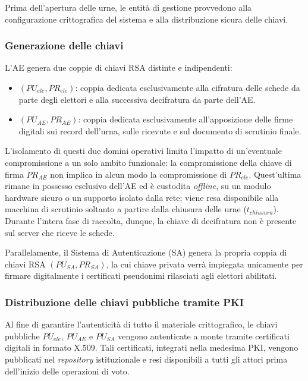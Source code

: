 Prima dell'apertura delle urne, le entità di gestione provvedono alla configurazione crittografica del sistema e alla distribuzione sicura delle chiavi.

\subsubsection{Generazione delle chiavi}
\label{subsubsec:wp2_generazione_chiavi}

L'AE genera due coppie di chiavi RSA distinte e indipendenti:
\begin{itemize}
    \item $(PU_{ele}, PR_{ele})$: coppia dedicata esclusivamente alla cifratura delle schede da parte degli elettori e alla successiva decifratura da parte dell'AE.
    \item $(PU_{AE}, PR_{AE})$: coppia dedicata esclusivamente all'apposizione delle firme digitali sui record dell'urna, sulle ricevute e sul documento di scrutinio finale.
\end{itemize}
L'isolamento di questi due domini operativi limita l'impatto di un'eventuale compromissione a un solo ambito funzionale: la compromissione della chiave di firma $PR_{AE}$ non implica in alcun modo la compromissione di $PR_{ele}$. Quest'ultima rimane in possesso esclusivo dell'AE ed è custodita \textit{offline}, su un modulo hardware sicuro o un supporto isolato dalla rete; viene resa disponibile alla macchina di scrutinio soltanto a partire dalla chiusura delle urne ($t_{chiusura}$). Durante l'intera fase di raccolta, dunque, la chiave di decifratura non è presente sul server che riceve le schede.

Parallelamente, il Sistema di Autenticazione (SA) genera la propria coppia di chiavi RSA $(PU_{SA}, PR_{SA})$, la cui chiave privata verrà impiegata unicamente per firmare digitalmente i certificati pseudonimi rilasciati agli elettori abilitati.

\subsubsection{Distribuzione delle chiavi pubbliche tramite PKI}
\label{subsubsec:wp2_pki}

Al fine di garantire l'autenticità di tutto il materiale crittografico, le chiavi pubbliche $PU_{ele}$, $PU_{AE}$ e $PU_{SA}$ vengono autenticate a monte tramite certificati digitali in formato X.509. Tali certificati, integrati nella medesima PKI, vengono pubblicati nel \textit{repository} istituzionale e resi disponibili a tutti gli attori prima dell'inizio delle operazioni di voto.

